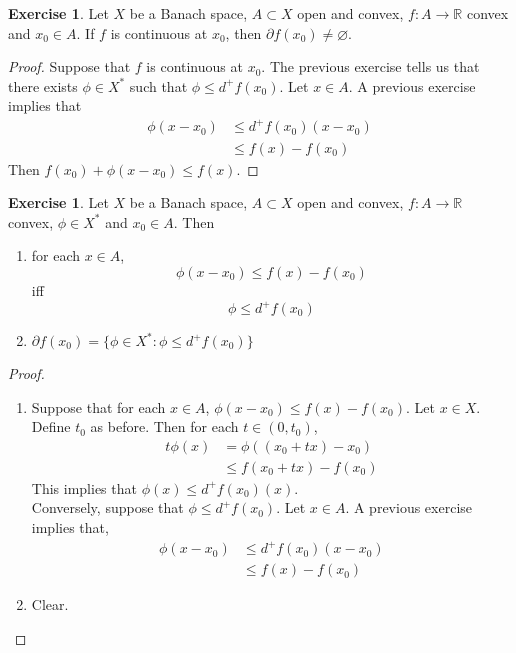 \documentclass[12pt]{amsart}
\theoremstyle{definition}
\theoremstyle{remark}
\theoremstyle{definition}
\newtheorem{ex}[definition]{Exercise}
\newcommand{\R}{\mathbb{R}}
\newcommand{\p}{\partial}
\begin{document}
	\begin{ex}
	Let $X$ be a Banach space, $A \subset X$ open and convex, $f:A \rightarrow \R$ convex and $x_0 \in A$. If $f$ is continuous at $x_0$, then $\p f(x_0) \neq \varnothing$.
	\end{ex}
	
	\begin{proof}
	Suppose that $f$ is continuous at $x_0$. The previous exercise tells us that there exists $\phi \in X^*$ such that $\phi \leq d^+f(x_0)$. Let $x \in A$. A previous exercise implies that
	\begin{align*}
	\phi(x-x_0) 
	& \leq d^+f(x_0)(x - x_0) \\
	& \leq f(x) - f(x_0)
	\end{align*}
	Then $f(x_0) + \phi(x-x_0) \leq f(x)$.
	\end{proof}
	
	\begin{ex}
	Let $X$ be a Banach space, $A \subset X$ open and convex, $f:A \rightarrow \R$ convex, $\phi \in X^*$ and $x_0 \in A$. Then 
	\begin{enumerate}
	\item for each $x \in A$, $$\phi(x-x_0) \leq f(x) - f(x_0)$$ iff  $$\phi \leq d^+f(x_0)$$ 
	\item  $\p f(x_0) = \{ \phi \in X^*: \phi \leq d^+ f(x_0)\}$
	\end{enumerate}
	\end{ex}	
	
	\begin{proof}\
	\begin{enumerate}
	\item Suppose that for each $x \in A$, $\phi(x-x_0) \leq f(x) - f(x_0)$. Let $x \in X$. Define $t_0$ as before. Then for each $t \in (0, t_0)$, 
	\begin{align*}
	t\phi(x)
	&= \phi((x_0 + tx) - x_0) \\
	& \leq f(x_0 + tx) - f(x_0)
	\end{align*}	 
	This implies that $\phi(x) \leq d^+f(x_0)(x)$.\\
	Conversely, suppose that $\phi \leq d^+f(x_0)$. Let $x \in A$. A previous exercise implies that, 
	\begin{align*}
	\phi(x-x_0) 
	& \leq d^+f(x_0)(x-x_0) \\
	&\leq f(x) - f(x_0)
	\end{align*}
	\item Clear.
	\end{enumerate}
	\end{proof}
	
\end{document}
